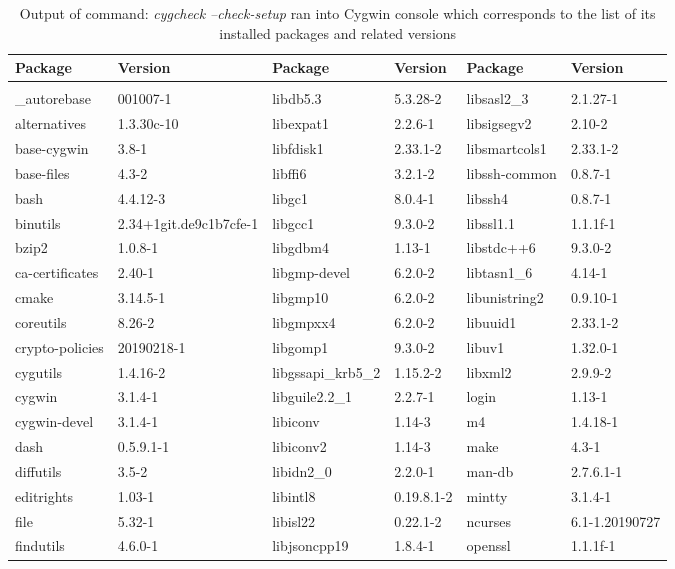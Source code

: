 \documentclass[11pt, english, openany]{report}
\begin{document}
\begin{appendices}
\begin{itemize}
\begin{table}[h]
\scriptsize
	\begin{center}
		\caption{Output of command: \textit{cygcheck --check-setup} ran into Cygwin console which corresponds to the list of its installed packages and related versions}
		\label{tab:packages}
		\begin{tabular}{ll|ll|ll}
			Package & Version & Package & Version & Package & Version \\ \hline
			&&&&& \\
			\_autorebase & 001007-1 & 	libdb5.3 & 5.3.28-2 & 	libsasl2\_3 & 2.1.27-1 \\
			alternatives & 1.3.30c-10 & 	libexpat1 & 2.2.6-1 & 	libsigsegv2 & 2.10-2 \\
			base-cygwin & 3.8-1 & 	libfdisk1 & 2.33.1-2 & 	libsmartcols1 & 2.33.1-2 \\
			base-files & 4.3-2 & 	libffi6 & 3.2.1-2 & 	libssh-common & 0.8.7-1 \\
			bash & 4.4.12-3 & 	libgc1 & 8.0.4-1 & 	libssh4 & 0.8.7-1 \\
			binutils & 2.34+1git.de9c1b7cfe-1 & 	libgcc1 & 9.3.0-2 & 	libssl1.1 & 1.1.1f-1 \\
			bzip2 & 1.0.8-1 & 	libgdbm4 & 1.13-1 & 	libstdc++6 & 9.3.0-2 \\
			ca-certificates & 2.40-1 & 	libgmp-devel & 6.2.0-2 & 	libtasn1\_6 & 4.14-1 \\
			cmake & 3.14.5-1 & 	libgmp10 & 6.2.0-2 & 	libunistring2 & 0.9.10-1 \\
			coreutils & 8.26-2 & 	libgmpxx4 & 6.2.0-2 & 	libuuid1 & 2.33.1-2 \\
			crypto-policies & 20190218-1 & 	libgomp1 & 9.3.0-2 & 	libuv1 & 1.32.0-1 \\
			cygutils & 1.4.16-2 & 	libgssapi\_krb5\_2 & 1.15.2-2 & 	libxml2 & 2.9.9-2 \\
			cygwin & 3.1.4-1 & 	libguile2.2\_1 & 2.2.7-1 & 	login & 1.13-1 \\
			cygwin-devel & 3.1.4-1 & 	libiconv & 1.14-3 & 	m4 & 1.4.18-1 \\
			dash & 0.5.9.1-1 & 	libiconv2 & 1.14-3 & 	make & 4.3-1 \\
			diffutils & 3.5-2 & 	libidn2\_0 & 2.2.0-1 & 	man-db & 2.7.6.1-1 \\
			editrights & 1.03-1 & 	libintl8 & 0.19.8.1-2 & 	mintty & 3.1.4-1 \\
			file & 5.32-1 & 	libisl22 & 0.22.1-2 & 	ncurses & 6.1-1.20190727 \\
			findutils & 4.6.0-1 & 	libjsoncpp19 & 1.8.4-1 & 	openssl & 1.1.1f-1 \\

\end{tabular}
\end{center}
\end{table}
\end{itemize}
\end{appendices}
\end{document}
